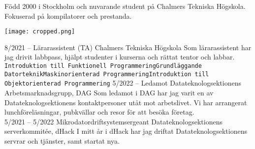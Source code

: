 \documentclass[9pt]{developercv} %
\begin{document}
\vspace{0.5cm}



\begin{minipage}[t]{0.8\textwidth} %
	\vspace{-\baselineskip} %

	Född 2000 i Stockholm och nuvarande student på Chalmers Tekniska
	Högskola. \\Fokuserad på kompilatorer och prestanda.
\end{minipage}
\hfill %
\begin{minipage}[t]{0.2\textwidth} %
	\vspace{-\baselineskip} %
	\texttt{[image: cropped.png]}
\end{minipage}



\begin{entrylist}
	\entry
		{8/2021 -- }
		{Lärarassistent (TA)}
		{Chalmers Tekniska Högskola}
		{Som lärarassistent har jag drivit labbpass, hjälpt studenter i
		kurserna och rättat tentor och labbar.\\ \texttt{Introduktion
		till Funktionell Programmering}\slashsep\texttt{Grundläggande
		Datorteknik}\slashsep\texttt{Maskinorienterad
		Programmering}\slashsep\texttt{Introduktion till
		Objektorienterad Programmering}}
	\entry
		{5/2022 -- }
		{Ledamot}
		{Datateknologsektionens Arbetsmarknadsgrupp, DAG}
		{Som ledamot i DAG har jag varit en av Datateknologsektionens
		kontaktpersoner utåt mot arbetslivet. Vi har arrangerat
		lunchföreläsningar, pubkvällar och resor för att besöka
		företag.\\}
	\entry
		{5/2021 -- 5/2022}
		{Mikrodatordriftsystemsergeant}
		{Datateknologsektionens serverkommitée, dHack}
		{I mitt år i dHack har jag driftat Datateknologsektionens
		servrar och tjänster, samt startat nya.\\}
\end{entrylist}
\end{document}

